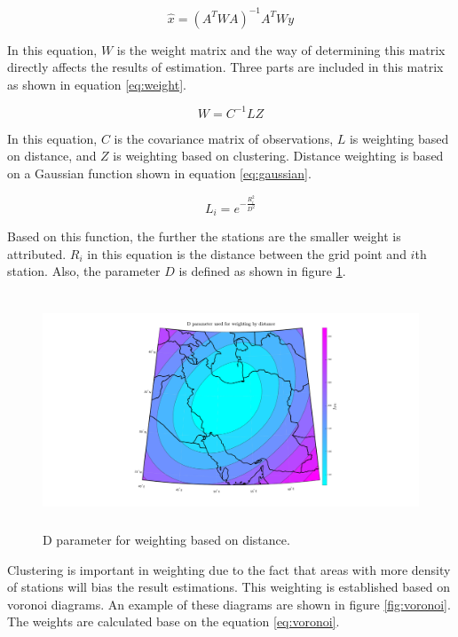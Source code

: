 \documentclass[12pt]{article}
\begin{document}
	\begin{equation}
		\hat{x} = (A^TWA)^{-1}A^TWy
		\label{eq:ls}
	\end{equation}
	
	In this equation, $W$ is the weight matrix and the way of determining this matrix directly affects the results of estimation. Three parts are included in this matrix as shown in equation \ref{eq:weight}.
	
	\begin{equation}
		W = C^{-1}LZ
		\label{eq:weight}
	\end{equation}
	
	In this equation, $C$ is the covariance matrix of observations, $L$ is weighting based on distance, and $Z$ is weighting based on clustering. Distance weighting is based on a Gaussian function shown in equation \ref{eq:gaussian}.
	
	\begin{equation}
		L_i = e^{-\frac{R_i^2}{D^2}}
		\label{eq:gaussian}
	\end{equation}
	
	Based on this function, the further the stations are the smaller weight is attributed. $R_i$ in this equation is the distance between the grid point and $i$th station. Also, the parameter $D$ is defined as shown in figure \ref{fig:D}.
	
	\begin{figure}[h!]
		\centering
		\includegraphics[height=7cm]{./Plots/DWeight.pdf}
		\caption{D parameter for weighting based on distance.}
		\label{fig:D}
	\end{figure}
	
	Clustering is important in weighting due to the fact that areas with more density of stations will bias the result estimations. This weighting is established based on voronoi diagrams. An example of these diagrams are shown in figure \ref{fig:voronoi}. The weights are calculated base on the equation \ref{eq:voronoi}.
	
\end{document}
